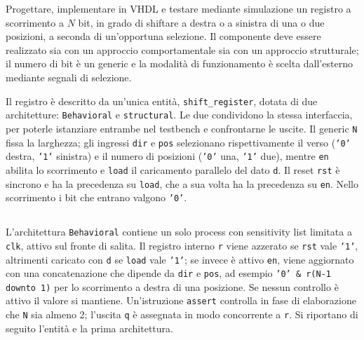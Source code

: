 \label{sec:esercizio4-1}

\begin{traccia}
Progettare, implementare in VHDL e testare mediante simulazione un registro a scorrimento a $N$ bit, in grado di shiftare a destra o a sinistra di una o due posizioni, a seconda di un'opportuna selezione. Il componente deve essere realizzato sia con un approccio comportamentale sia con un approccio strutturale; il numero di bit è un generic e la modalità di funzionamento è scelta dall'esterno mediante segnali di selezione.
\end{traccia}

\progetto

Il registro è descritto da un'unica entità, \texttt{shift\_register}, dotata di due architetture: \texttt{Behavioral} e \texttt{structural}. Le due condividono la stessa interfaccia, per poterle istanziare entrambe nel testbench e confrontarne le uscite. Il generic \texttt{N} fissa la larghezza; gli ingressi \texttt{dir} e \texttt{pos} selezionano rispettivamente il verso (\texttt{'0'} destra, \texttt{'1'} sinistra) e il numero di posizioni (\texttt{'0'} una, \texttt{'1'} due), mentre \texttt{en} abilita lo scorrimento e \texttt{load} il caricamento parallelo del dato \texttt{d}. Il reset \texttt{rst} è sincrono e ha la precedenza su \texttt{load}, che a sua volta ha la precedenza su \texttt{en}. Nello scorrimento i bit che entrano valgono \texttt{'0'}.

\subsection*{}

\implementazione

L'architettura \texttt{Behavioral} contiene un solo process con sensitivity list limitata a \texttt{clk}, attivo sul fronte di salita. Il registro interno \texttt{r} viene azzerato se \texttt{rst} vale \texttt{'1'}, altrimenti caricato con \texttt{d} se \texttt{load} vale \texttt{'1'}; se invece è attivo \texttt{en}, viene aggiornato con una concatenazione che dipende da \texttt{dir} e \texttt{pos}, ad esempio \texttt{'0' \& r(N-1 downto 1)} per lo scorrimento a destra di una posizione. Se nessun controllo è attivo il valore si mantiene. Un'istruzione \texttt{assert} controlla in fase di elaborazione che \texttt{N} sia almeno 2; l'uscita \texttt{q} è assegnata in modo concorrente a \texttt{r}. Si riportano di seguito l'entità e la prima architettura.

